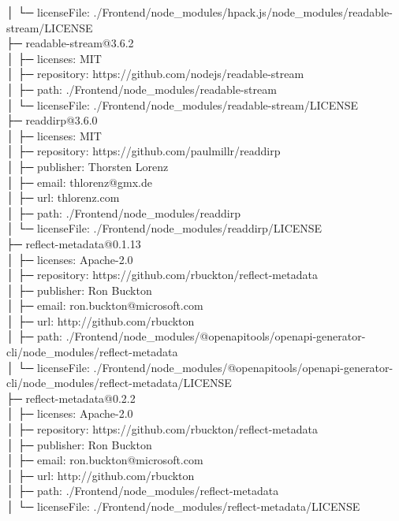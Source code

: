 │  └─ licenseFile: ./Frontend/node\_modules/hpack.js/node\_modules/readable-stream/LICENSE\\
├─ readable-stream@3.6.2\\
│  ├─ licenses: MIT\\
│  ├─ repository: https://github.com/nodejs/readable-stream\\
│  ├─ path: ./Frontend/node\_modules/readable-stream\\
│  └─ licenseFile: ./Frontend/node\_modules/readable-stream/LICENSE\\
├─ readdirp@3.6.0\\
│  ├─ licenses: MIT\\
│  ├─ repository: https://github.com/paulmillr/readdirp\\
│  ├─ publisher: Thorsten Lorenz\\
│  ├─ email: thlorenz@gmx.de\\
│  ├─ url: thlorenz.com\\
│  ├─ path: ./Frontend/node\_modules/readdirp\\
│  └─ licenseFile: ./Frontend/node\_modules/readdirp/LICENSE\\
├─ reflect-metadata@0.1.13\\
│  ├─ licenses: Apache-2.0\\
│  ├─ repository: https://github.com/rbuckton/reflect-metadata\\
│  ├─ publisher: Ron Buckton\\
│  ├─ email: ron.buckton@microsoft.com\\
│  ├─ url: http://github.com/rbuckton\\
│  ├─ path: ./Frontend/node\_modules/@openapitools/openapi-generator-cli/node\_modules/reflect-metadata\\
│  └─ licenseFile: ./Frontend/node\_modules/@openapitools/openapi-generator-cli/node\_modules/reflect-metadata/LICENSE\\
├─ reflect-metadata@0.2.2\\
│  ├─ licenses: Apache-2.0\\
│  ├─ repository: https://github.com/rbuckton/reflect-metadata\\
│  ├─ publisher: Ron Buckton\\
│  ├─ email: ron.buckton@microsoft.com\\
│  ├─ url: http://github.com/rbuckton\\
│  ├─ path: ./Frontend/node\_modules/reflect-metadata\\
│  └─ licenseFile: ./Frontend/node\_modules/reflect-metadata/LICENSE\\
